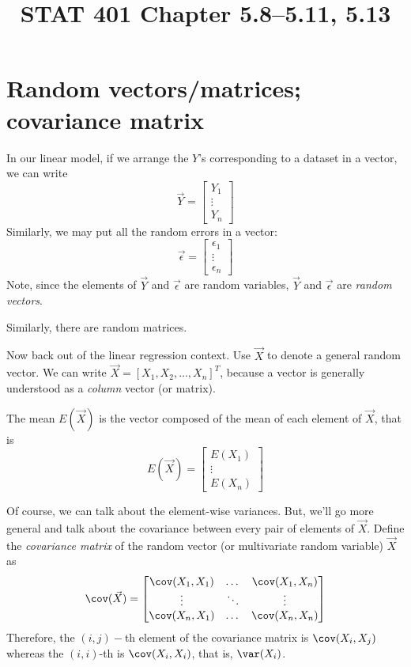 \documentclass[12pt]{article}
\title{STAT 401 Chapter 5.8--5.11, 5.13}
\begin{document}
\maketitle

\section{Random vectors/matrices; covariance matrix}

In our linear model,
if we arrange the $Y$'s corresponding to a dataset in a vector, we can
write
\[
\vec{Y} =
    \begin{bmatrix}
        Y_1\\ \vdots\\ Y_n
    \end{bmatrix}
\]
Similarly, we may put all the random errors in a vector:
\[
\vec{\epsilon} =
    \begin{bmatrix}
        \epsilon_1\\ \vdots\\ \epsilon_n
    \end{bmatrix}
\]
Note,
since the elements of $\vec{Y}$ and $\vec{\epsilon}$
are random variables,
$\vec{Y}$ and $\vec{\epsilon}$ are \emph{random vectors}.

Similarly, there are random matrices.

Now back out of the linear regression context.
Use $\vec{X}$ to denote a general random vector.
We can write
$\vec{X} = [X_1, X_2,\dotsc, X_n]^T$,
because a vector is generally understood as a \emph{column} vector
(or matrix).

The mean $E(\vec{X})$ is the vector composed of
the mean of each element of $\vec{X}$, that is
\[
E(\vec{X}) =
\begin{bmatrix}
    E(X_1)\\
    \vdots\\
    E(X_n)
\end{bmatrix}
\]

Of course, we can talk about the element-wise variances.
But, we'll go more general and talk about the covariance between every
pair of elements of $\vec{X}$.
Define the \emph{covariance matrix} of the random vector
(or multivariate random variable) $\vec{X}$
as
\[
\cov(\vec{X})
= \begin{bmatrix}
    \cov(X_1,X_1) & \dotso & \cov(X_1,X_n) \\
    \vdots  & \ddots & \vdots\\
    \cov(X_n,X_1) & \dotso & \cov(X_n,X_n)
  \end{bmatrix}
\]
Therefore, the $(i,j)-$th element of the covariance matrix is
$\cov(X_i,X_j)$ whereas the $(i,i)$-th is $\cov(X_i,X_i)$, that is,
$\var(X_i)$.
\end{document}
